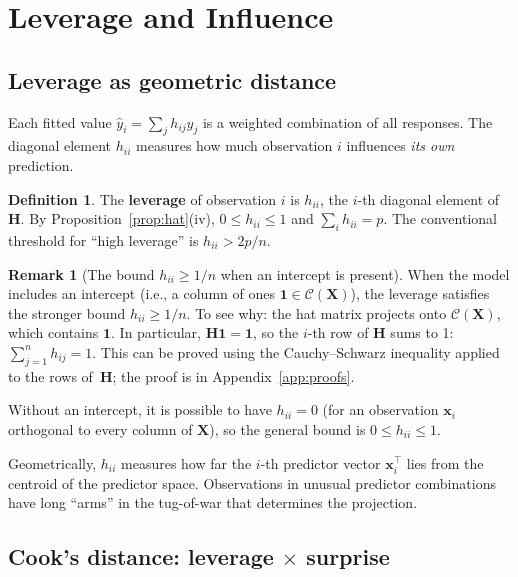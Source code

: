 \documentclass[11pt,a4paper]{article}
\theoremstyle{plain}
\theoremstyle{definition}
\newtheorem{definition}[theorem]{Definition}
\newtheorem{remark}[theorem]{Remark}
\newcommand{\bX}{\bm{X}}
\newcommand{\bH}{\bm{H}}
\newcommand{\Col}{\mathcal{C}}
\begin{document}
\section{Leverage and Influence}\label{sec:leverage}

\subsection{Leverage as geometric distance}

Each fitted value $\hat{y}_i = \sum_j h_{ij}y_j$ is a weighted
combination of all responses. The diagonal element $h_{ii}$
measures how much observation $i$ influences \emph{its own} prediction.

\begin{definition}
The \textbf{leverage} of observation $i$ is $h_{ii}$, the $i$-th diagonal
element of $\bH$. By Proposition~\ref{prop:hat}(iv),
$0 \le h_{ii} \le 1$ and $\sum_i h_{ii} = p$.
The conventional threshold for ``high leverage'' is $h_{ii} > 2p/n$.
\end{definition}

\begin{remark}[The bound $h_{ii}\ge 1/n$ when an intercept is present]\label{rem:hii-intercept}
When the model includes an intercept (i.e., a column of ones $\bm{1}\in\Col(\bX)$),
the leverage satisfies the stronger bound $h_{ii}\ge 1/n$.
To see why: the hat matrix projects onto $\Col(\bX)$, which contains $\bm{1}$.
In particular, $\bH\bm{1} = \bm{1}$, so the $i$-th row of $\bH$ sums to 1:
$\sum_{j=1}^n h_{ij} = 1$.
This can be proved using the Cauchy--Schwarz inequality applied to the
rows of~$\bH$; the proof is in Appendix~\ref{app:proofs}.

Without an intercept, it is possible to have $h_{ii} = 0$ (for an observation
$\bm{x}_i$ orthogonal to every column of $\bX$), so the general bound is
$0 \le h_{ii} \le 1$.
\end{remark}

Geometrically, $h_{ii}$ measures how far the $i$-th predictor vector
$\bm{x}_i^\top$ lies from the centroid of the predictor space.
Observations in unusual predictor combinations have long ``arms''
in the tug-of-war that determines the projection.

\subsection{Cook's distance: leverage $\times$ surprise}
\end{document}

